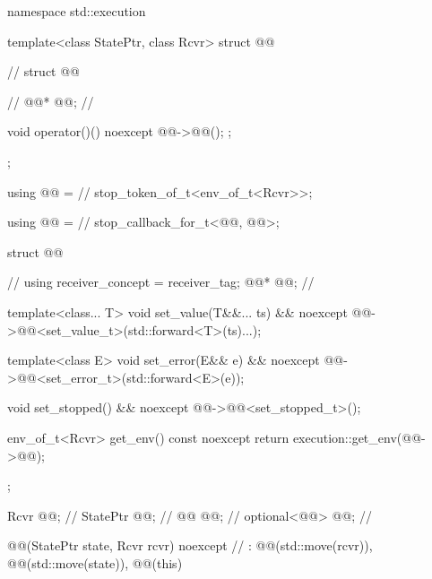\begin{codeblock}
namespace std::execution {
  template<class StatePtr, class Rcvr>
  struct @@ {                                     // \expos
    struct @@ {                                           // \expos
      @@* @@;                                    // \expos

      void operator()() noexcept {
        @@->@@();
      };
    };

    using @@ =                                        // \expos
      stop_token_of_t<env_of_t<Rcvr>>;

    using @@ =                                     // \expos
      stop_callback_for_t<@@, @@>;

    struct @@ {                                             // \expos
      using receiver_concept = receiver_tag;
      @@* @@;                                     // \expos

      template<class... T>
      void set_value(T&&... ts) && noexcept {
        @@->@@<set_value_t>(std::forward<T>(ts)...);
      }

      template<class E>
      void set_error(E&& e) && noexcept {
        @@->@@<set_error_t>(std::forward<E>(e));
      }

      void set_stopped() && noexcept {
        @@->@@<set_stopped_t>();
      }

      env_of_t<Rcvr> get_env() const noexcept {
        return execution::get_env(@@->@@);
      }
    };

    Rcvr @@;                                                  // \expos
    StatePtr @@;                                             // \expos
    @@ @@;                                               // \expos
    optional<@@> @@;                     // \expos


    @@(StatePtr state, Rcvr rcvr) noexcept        // \expos
      : @@(std::move(rcvr)), @@(std::move(state)), @@(this)
    {}

}}
\end{codeblock}
